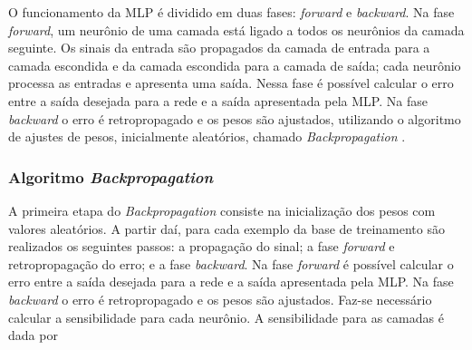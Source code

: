 O funcionamento da MLP é dividido em duas fases: \textit{forward} e \textit{backward}. Na fase \textit{forward}, um neurônio de uma camada está ligado a todos os neurônios da camada seguinte. Os sinais da entrada são propagados da camada de entrada para a camada escondida e da camada escondida para a camada de saída; cada neurônio processa as entradas e apresenta uma saída. Nessa fase é possível calcular o erro entre a saída desejada para a rede e a saída apresentada pela MLP. Na fase \textit{backward} o erro é retropropagado e os pesos são ajustados, utilizando o algoritmo de ajustes de pesos, inicialmente aleatórios, chamado \textit{Backpropagation} \cite{valenca2005aplicando}.

\subsubsection{Algoritmo \textit{Backpropagation}}

A primeira etapa do \textit{Backpropagation} consiste na inicialização dos pesos com valores aleatórios. A partir daí, para cada exemplo da base de treinamento são realizados os seguintes passos: a propagação do sinal; a fase \textit{forward} e retropropagação do erro; e a fase \textit{backward}. Na fase \textit{forward} é possível calcular o erro entre a saída desejada para a rede e a saída apresentada pela MLP. Na fase \textit{backward} o erro é retropropagado e os pesos são ajustados. Faz-se necessário calcular a sensibilidade para cada neurônio. A sensibilidade para as camadas é dada por

